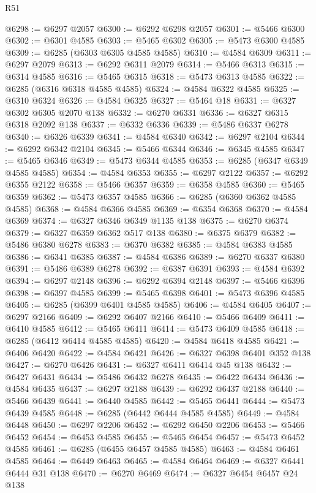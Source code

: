 \begin{lexlean}{R51}
\begin{coremodule}
@6298 := @6297 @2057
@6300 := @6292 @6298 @2057
@6301 := @5466 @6300
@6302 := @6301 @4585
@6303 := @5465 @6302
@6305 := @5473 @6300 @4585
@6309 := @6285 (@6303 @6305 @4585 @4585)
@6310 := @4584 @6309
@6311 := @6297 @2079
@6313 := @6292 @6311 @2079
@6314 := @5466 @6313
@6315 := @6314 @4585
@6316 := @5465 @6315
@6318 := @5473 @6313 @4585
@6322 := @6285 (@6316 @6318 @4585 @4585)
@6324 := @4584 @6322 @4585
@6325 := @6310 @6324
@6326 := @4584 @6325
@6327 := @5464 @18
@6331 := @6327 @6302 @6305 @2070 @138
@6332 := @6270 @6331
@6336 := @6327 @6315 @6318 @2092 @138
@6337 := @6332 @6336
@6339 := @5486 @6337 @6278
@6340 := @6326 @6339
@6341 := @4584 @6340
@6342 := @6297 @2104
@6344 := @6292 @6342 @2104
@6345 := @5466 @6344
@6346 := @6345 @4585
@6347 := @5465 @6346
@6349 := @5473 @6344 @4585
@6353 := @6285 (@6347 @6349 @4585 @4585)
@6354 := @4584 @6353
@6355 := @6297 @2122
@6357 := @6292 @6355 @2122
@6358 := @5466 @6357
@6359 := @6358 @4585
@6360 := @5465 @6359
@6362 := @5473 @6357 @4585
@6366 := @6285 (@6360 @6362 @4585 @4585)
@6368 := @4584 @6366 @4585
@6369 := @6354 @6368
@6370 := @4584 @6369
@6374 := @6327 @6346 @6349 @1135 @138
@6375 := @6270 @6374
@6379 := @6327 @6359 @6362 @517 @138
@6380 := @6375 @6379
@6382 := @5486 @6380 @6278
@6383 := @6370 @6382
@6385 := @4584 @6383 @4585
@6386 := @6341 @6385
@6387 := @4584 @6386
@6389 := @6270 @6337 @6380
@6391 := @5486 @6389 @6278
@6392 := @6387 @6391
@6393 := @4584 @6392
@6394 := @6297 @2148
@6396 := @6292 @6394 @2148
@6397 := @5466 @6396
@6398 := @6397 @4585
@6399 := @5465 @6398
@6401 := @5473 @6396 @4585
@6405 := @6285 (@6399 @6401 @4585 @4585)
@6406 := @4584 @6405
@6407 := @6297 @2166
@6409 := @6292 @6407 @2166
@6410 := @5466 @6409
@6411 := @6410 @4585
@6412 := @5465 @6411
@6414 := @5473 @6409 @4585
@6418 := @6285 (@6412 @6414 @4585 @4585)
@6420 := @4584 @6418 @4585
@6421 := @6406 @6420
@6422 := @4584 @6421
@6426 := @6327 @6398 @6401 @352 @138
@6427 := @6270 @6426
@6431 := @6327 @6411 @6414 @45 @138
@6432 := @6427 @6431
@6434 := @5486 @6432 @6278
@6435 := @6422 @6434
@6436 := @4584 @6435
@6437 := @6297 @2188
@6439 := @6292 @6437 @2188
@6440 := @5466 @6439
@6441 := @6440 @4585
@6442 := @5465 @6441
@6444 := @5473 @6439 @4585
@6448 := @6285 (@6442 @6444 @4585 @4585)
@6449 := @4584 @6448
@6450 := @6297 @2206
@6452 := @6292 @6450 @2206
@6453 := @5466 @6452
@6454 := @6453 @4585
@6455 := @5465 @6454
@6457 := @5473 @6452 @4585
@6461 := @6285 (@6455 @6457 @4585 @4585)
@6463 := @4584 @6461 @4585
@6464 := @6449 @6463
@6465 := @4584 @6464
@6469 := @6327 @6441 @6444 @31 @138
@6470 := @6270 @6469
@6474 := @6327 @6454 @6457 @24 @138

\end{coremodule}
\end{lexlean}
